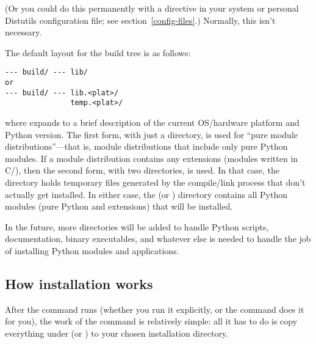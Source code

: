 \documentclass{howto}
\begin{document}
(Or you could do this permanently with a directive in your system or
personal Distutils configuration file; see
section~\ref{config-files}.)  Normally, this isn't necessary.

The default layout for the build tree is as follows:

\begin{verbatim}
--- build/ --- lib/
or
--- build/ --- lib.<plat>/
               temp.<plat>/
\end{verbatim}

where  expands to a brief description of the current
OS/hardware platform and Python version.  The first form, with just a
 directory, is used for ``pure module distributions''---that
is, module distributions that include only pure Python modules.  If a
module distribution contains any extensions (modules written in C/\Cpp),
then the second form, with two  directories, is used.  In
that case, the  directory holds temporary
files generated by the compile/link process that don't actually get
installed.  In either case, the  (or
) directory contains all Python modules (pure
Python and extensions) that will be installed.

In the future, more directories will be added to handle Python scripts,
documentation, binary executables, and whatever else is needed to handle
the job of installing Python modules and applications.


\subsection{How installation works}
\label{how-install-works}

After the  command runs (whether you run it explicitly,
or the  command does it for you), the work of the
 command is relatively simple: all it has to do is copy
everything under  (or )
to your chosen installation directory.
\end{document}
